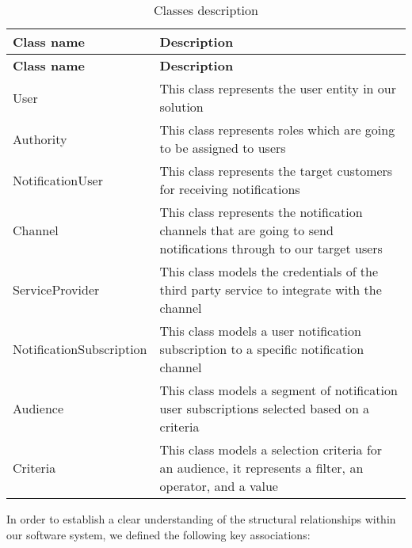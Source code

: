 \begin{longtable}{ | m{} | m{} | }
    \caption{Classes description}                                                                                                               \\
    \hline
    \textbf{Class name}      & \textbf{Description}                                                                                             \\
    \hline
    \endfirsthead
    \hline
    \textbf{Class name}      & \textbf{Description}                                                                                             \\
    \hline
    \endhead
    \endfoot
    \hline
    \endlastfoot
    User                     & This class represents the user entity in our solution                                                            \\
    \hline
    Authority                & This class represents roles which are going to be assigned to users                                              \\
    \hline
    NotificationUser         & This class represents the target customers for receiving notifications                                           \\
    \hline
    Channel                  & This class represents the notification channels that are going to send notifications through to our target users \\
    \hline
    ServiceProvider          & This class models the credentials of the third party service to integrate with the channel                       \\
    \hline
    NotificationSubscription & This class models a user notification subscription to a specific notification channel                            \\
    \hline
    Audience                 & This class models a segment of notification user subscriptions selected based on a criteria                      \\
    \hline
    Criteria                 & This class models a selection criteria for an audience, it represents a filter, an operator, and a value         \\
\end{longtable}

\noindent In order to establish a clear understanding of the structural relationships within our software system,
we defined the following key associations:

